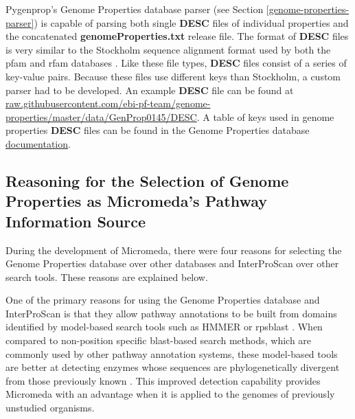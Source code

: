 Pygenprop's Genome Properties database parser (see Section 
\ref{genome-properties-parser}) is capable of parsing both single \textbf{DESC} 
files of individual properties and the concatenated 
\textbf{genomeProperties.txt} release file. The format of \textbf{DESC} files is 
very similar to the Stockholm sequence alignment format used by both the 
\gls{pfam} and \gls{rfam} databases \cite{bateman2004pfam, griffiths2003rfam}. Like 
these file types, \textbf{DESC} files consist of a series of key-value pairs. 
Because these files use different keys than Stockholm, a custom parser had to be 
developed. An example \textbf{DESC} file can be found at 
\href{http://raw.githubusercontent.com/ebi-pf-team/genome-properties/master/data/GenProp0145/DESC}{raw.githubusercontent.com/ebi-pf-team/genome-properties/master/data/GenProp0145/DESC}. 
A table of keys used in  genome properties \textbf{DESC} files can be found in 
the Genome Properties database 
\href{https://genome-properties.readthedocs.io/en/latest}{documentation}.

\subsection{Reasoning for the Selection of Genome Properties as Micromeda's 
Pathway Information Source} \label{reason-for-genome-properties-selection}

During the development of Micromeda, there were four reasons for selecting the 
Genome Properties database over other databases and InterProScan over other 
search tools. These reasons are explained below.

One of the primary reasons for using the Genome Properties database and 
InterProScan is that they allow pathway annotations to be built from domains 
identified by model-based search tools such as HMMER \cite{eddy2011accelerated} 
or \gls{rpsblast} \cite{mcginnis2004blast}. When compared to non-position
specific \gls{blast}-based \cite{altschul1990basic} search methods, which are 
commonly used by other pathway annotation systems, these model-based tools are 
better at detecting enzymes whose sequences are phylogenetically divergent from 
those previously known \cite{eddy2011accelerated}. This improved detection 
capability provides Micromeda with an advantage when it is applied to the 
genomes of previously unstudied organisms.


